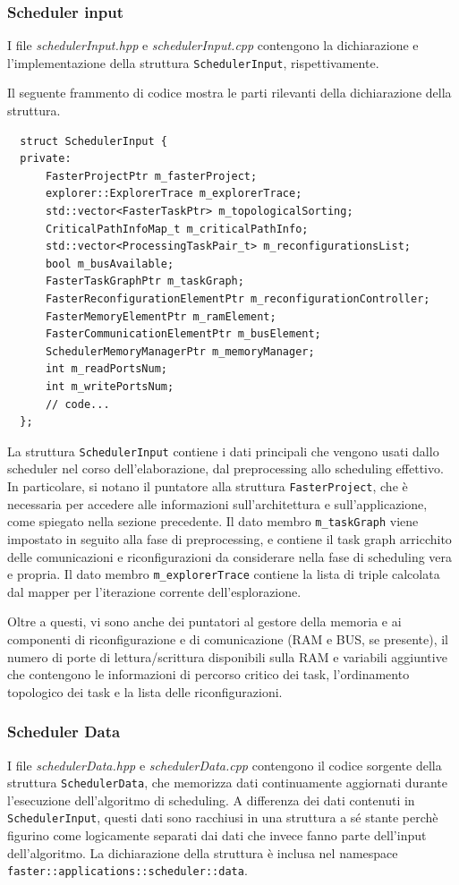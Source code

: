 \subsubsection{Scheduler input}
I file \emph{schedulerInput.hpp} e \emph{schedulerInput.cpp} contengono la 
dichiarazione e l'implementazione della struttura \verb+SchedulerInput+, 
rispettivamente.

Il seguente frammento di codice mostra le parti rilevanti della 
dichiarazione della struttura.
\newline
\begin{verbatim}
  struct SchedulerInput {
  private:
      FasterProjectPtr m_fasterProject;
      explorer::ExplorerTrace m_explorerTrace;
      std::vector<FasterTaskPtr> m_topologicalSorting;
      CriticalPathInfoMap_t m_criticalPathInfo;
      std::vector<ProcessingTaskPair_t> m_reconfigurationsList;
      bool m_busAvailable;
      FasterTaskGraphPtr m_taskGraph;
      FasterReconfigurationElementPtr m_reconfigurationController;
      FasterMemoryElementPtr m_ramElement;
      FasterCommunicationElementPtr m_busElement;
      SchedulerMemoryManagerPtr m_memoryManager;
      int m_readPortsNum;
      int m_writePortsNum;
      // code...
  };
\end{verbatim}
La struttura \verb+SchedulerInput+ contiene i dati principali che vengono usati 
dallo scheduler nel corso dell'elaborazione, dal preprocessing allo scheduling 
effettivo. In particolare, si notano il puntatore alla struttura 
\verb+FasterProject+, che è necessaria per accedere alle informazioni 
sull'architettura e sull'applicazione, come spiegato nella sezione precedente.
Il dato membro \verb+m_taskGraph+ viene impostato in seguito alla fase di 
preprocessing, e contiene il task graph arricchito delle comunicazioni e 
riconfigurazioni da considerare nella fase di scheduling vera e propria.
Il dato membro \verb+m_explorerTrace+ contiene la lista di triple calcolata dal
mapper per l'iterazione corrente dell'esplorazione.

Oltre a questi, vi sono anche dei puntatori al gestore della memoria e ai 
componenti di riconfigurazione e di comunicazione (\acs{RAM} e BUS, se 
presente), il numero di porte di lettura/scrittura disponibili sulla \acs{RAM} 
e variabili aggiuntive che contengono le informazioni di percorso critico dei 
task, l'ordinamento topologico dei task e la lista delle riconfigurazioni.

\subsubsection{Scheduler Data}
I file \emph{schedulerData.hpp} e \emph{schedulerData.cpp} contengono il codice 
sorgente della struttura \verb+SchedulerData+, che memorizza dati continuamente 
aggiornati durante l'esecuzione dell'algoritmo di scheduling. A differenza dei 
dati contenuti in \verb+SchedulerInput+, questi dati sono racchiusi in una 
struttura a sé stante perchè figurino come logicamente separati dai dati che 
invece fanno parte dell'input dell'algoritmo. La dichiarazione della struttura è
inclusa nel namespace \verb+faster::applications::scheduler::data+.

